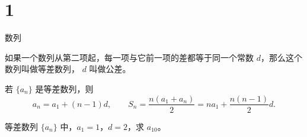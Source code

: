 \chapter{1}{数列}


\begin{definition}[等差数列]
如果一个数列从第二项起，每一项与它前一项的差都等于同一个常数 $d$，那么这个数列叫做等差数列，
$d$ 叫做公差。
\end{definition}

\begin{theorem}[等差数列通项公式与前 $n$ 项和]
若 $\{a_n\}$ 是等差数列，则
\[
a_n = a_1+(n-1)d, \qquad
S_n = \frac{n(a_1+a_n)}{2} = na_1+\frac{n(n-1)}{2}d .
\]
\end{theorem}


\begin{exercise}[]
等差数列 $\{a_n\}$ 中，$a_1=1$，$d=2$，求 $a_{10}$。
\end{exercise}

